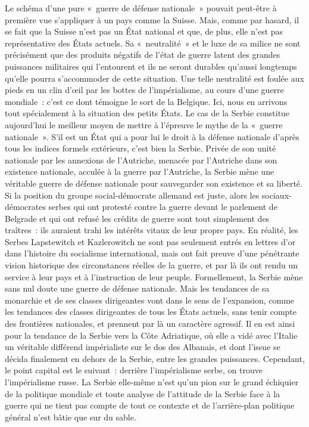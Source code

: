 \documentclass[french,twoside]{book} %
\begin{document}
Le schéma d’une pure « guerre de défense nationale » pouvait peut-être à première vue s’appliquer à un pays comme la Suisse. Mais, comme par hasard, il se fait que la Suisse n’est pas un État national et que, de plus, elle n’est pas représentative des États actuels. Sa « neutralité » et le luxe de sa milice ne sont précisément que des produits négatifs de l’état de guerre latent des grandes puissances militaires qui l’entourent et ils ne seront durables qu’aussi longtemps qu’elle pourra s’accommoder de cette situation. Une telle neutralité est foulée aux pieds en un clin d’œil par les bottes de l’impérialisme, au cours d’une guerre mondiale : c’est ce dont témoigne le sort de la Belgique. Ici, nous en arrivons tout spécialement à la situation des petits États. Le cas de la Serbie constitue aujourd’hui le meilleur moyen de mettre à l’épreuve le mythe de la « guerre nationale ». S'il est un État qui a pour lui le droit à la défense nationale d’après tous les indices formels extérieurs, c’est bien la Serbie. Privée de son unité nationale par les annexions de l’Autriche, menacée par l’Autriche dans son existence nationale, acculée à la guerre par l’Autriche, la Serbie mène une véritable guerre de défense nationale pour sauvegarder son existence et sa liberté. Si la position du groupe social-démocrate allemand est juste, alors les sociaux-démocrates serbes qui ont protesté contre la guerre devant le parlement de Belgrade et qui ont refusé les crédits de guerre sont tout simplement des traîtres : ils auraient trahi les intérêts vitaux de leur propre pays. En réalité, les Serbes Lapstewitch et Kazlerowitch ne sont pas seulement entrés en lettres d’or dans l’histoire du socialisme international, mais ont fait preuve d’une pénétrante vision historique des circonstances réelles de la guerre, et par là ils ont rendu un service à leur pays et à l’instruction de leur peuple. Formellement, la Serbie mène sans nul doute une guerre de défense nationale. Mais les tendances de sa monarchie et de ses classes dirigeantes vont dans le sens de l’expansion, comme les tendances des classes dirigeantes de tous les États actuels, sans tenir compte des frontières nationales, et prennent par là un caractère agressif. Il en est ainsi pour la tendance de la Serbie vers la Côte Adriatique, où elle a vidé avec l’Italie un véritable différend impérialiste sur le dos des Albanais, et dont l’issue se décida finalement en dehors de la Serbie, entre les grandes puissances. Cependant, le point capital est le suivant : derrière l’impérialisme serbe, on trouve l’impérialisme russe. La Serbie elle-même n’est qu’un pion sur le grand échiquier de la politique mondiale et toute analyse de l’attitude de la Serbie face à la guerre qui ne tient pas compte de tout ce contexte et de l’arrière-plan politique général n’est bâtie que sur du sable.\par
\end{document}
